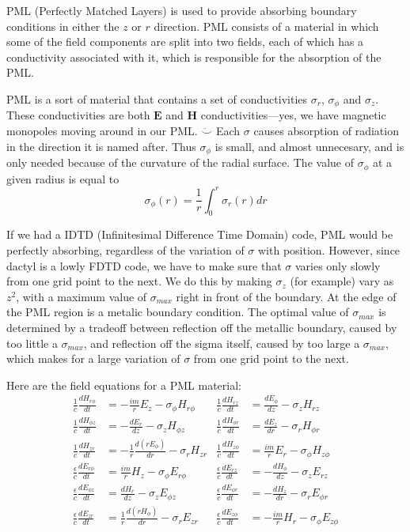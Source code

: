 \documentclass[floats]{report}
\begin{document}
PML (Perfectly Matched Layers) is used to provide absorbing boundary
conditions in either the $z$ or $r$ direction.  PML consists of a material
in which some of the field components are split into two fields, each of
which has a conductivity associated with it, which is responsible for the
absorption of the PML.

PML is a sort of material that contains a set of conductivities $\sigma_r$,
$\sigma_\phi$ and $\sigma_z$.  These conductivities are both $\mathbf{E}$
and $\mathbf{H}$ conductivities---yes, we have magnetic monopoles moving
around in our PML.  $\ddot\smile$ Each $\sigma$ causes absorption of
radiation in the direction it is named after.  Thus $\sigma_\phi$ is small,
and almost unnecesary, and is only needed because of the curvature of the
radial surface.  The value of $\sigma_\phi$ at a given radius is equal to
\begin{equation}
\sigma_\phi(r) = \frac1r \int_0^r \sigma_r(r)dr
\end{equation}

If we had a IDTD (Infinitesimal Difference Time Domain) code, PML would be
perfectly absorbing, regardless of the variation of $\sigma$ with position.
However, since dactyl is a lowly FDTD code, we have to make sure that
$\sigma$ varies only slowly from one grid point to the next.  We do this by
making $\sigma_z$ (for example) vary as $z^2$, with a maximum value of
$\sigma_{max}$ right in front of the boundary.  At the edge of the PML
region is a metalic boundary condition.  The optimal value of
$\sigma_{max}$ is determined by a tradeoff between reflection off the
metallic boundary, caused by too little a $\sigma_{max}$, and reflection
off the sigma itself, caused by too large a $\sigma_{max}$, which makes for
a large variation of $\sigma$ from one grid point to the next.

Here are the field equations for a PML material:
\begin{align}
\frac1c\frac{dH_{r\phi}}{dt} &= - \frac{im}r E_z             - \sigma_\phi H_{r\phi} &
\frac1c\frac{dH_{rz}}{dt} &= \frac{dE_\phi}{dz}              - \sigma_z H_{rz}\\
\frac1c\frac{dH_{\phi z}}{dt} &= - \frac{dE_r}{dz}           - \sigma_z H_{\phi z} &
\frac1c\frac{dH_{\phi r}}{dt} &= \frac{dE_z}{dr}             - \sigma_r H_{\phi r} \\
\frac1c\frac{dH_{zr}}{dt} &= - \frac1r\frac{d(rE_\phi)}{dr}  - \sigma_r H_{zr}  &
\frac1c\frac{dH_{z\phi}}{dt} &= \frac{im}r E_r               - \sigma_\phi H_{z\phi} \\
\frac\epsilon c\frac{dE_{r\phi}}{dt} &=   \frac{im}r H_z             - \sigma_\phi E_{r\phi} &
\frac\epsilon c\frac{dE_{rz}}{dt} &=-\frac{dH_\phi}{dz}              - \sigma_z E_{rz}\\
\frac\epsilon c\frac{dE_{\phi z}}{dt} &=   \frac{dH_r}{dz}           - \sigma_z E_{\phi z} &
\frac\epsilon c\frac{dE_{\phi r}}{dt} &=-\frac{dH_z}{dr}             - \sigma_r E_{\phi r} \\
\frac\epsilon c\frac{dE_{zr}}{dt} &=   \frac1r\frac{d(rH_\phi)}{dr}  - \sigma_r E_{zr}  &
\frac\epsilon c\frac{dE_{z\phi}}{dt} &=-\frac{im}r H_r               - \sigma_\phi E_{z\phi} 
\end{align}

\appendix


\end{document}
